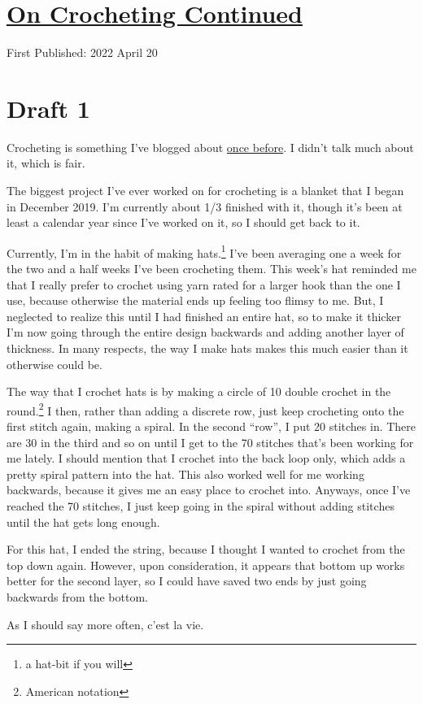 \documentclass[12pt]{article}[titlepage]
\newcommand{\say}[1]{``#1''}
\newcommand{\1}{\={a}}
\newcommand{\2}{\={e}}
\newcommand{\3}{\={\i}}
\newcommand{\4}{\=o}
\newcommand{\5}{\=u}
\newcommand{\6}{\={A}}
\renewcommand{\,}{\textsuperscript{,}}
\begin{document}
\doublespacing
\section{\href{crochet-1.html}{On Crocheting Continued}}
First Published: 2022 April 20


\section{Draft 1}
Crocheting is something I've blogged about \href{crocheting.html}{once before}.
I didn't talk much about it, which is fair.

The biggest project I've ever worked on for crocheting is a blanket that I began in December 2019.
I'm currently about 1/3 finished with it, though it's been at least a calendar year since I've worked on it, so I should get back to it.

Currently, I'm in the habit of making hats.\footnote{a hat-bit if you will}
I've been averaging one a week for the two and a half weeks I've been crocheting them.
This week's hat reminded me that I really prefer to crochet using yarn rated for a larger hook than the one I use, because otherwise the material ends up feeling too flimsy to me.
But, I neglected to realize this until I had finished an entire hat, so to make it thicker I'm now going through the entire design backwards and adding another layer of thickness.
In many respects, the way I make hats makes this much easier than it otherwise could be.

The way that I crochet hats is by making a circle of 10 double crochet in the round.\footnote{American notation}
I then, rather than adding a discrete row, just keep crocheting onto the first stitch again, making a spiral.
In the second \say{row}, I put 20 stitches in.
There are 30 in the third and so on until I get to the 70 stitches that's been working for me lately.
I should mention that I crochet into the back loop only, which adds a pretty spiral pattern into the hat.
This also worked well for me working backwards, because it gives me an easy place to crochet into.
Anyways, once I've reached the 70 stitches, I just keep going in the spiral without adding stitches until the hat gets long enough.

For this hat, I ended the string, because I thought I wanted to crochet from the top down again.
However, upon consideration, it appears that bottom up works better for the second layer, so I could have saved two ends by just going backwards from the bottom.

As I should say more often, c'est la vie.
\end{document}
